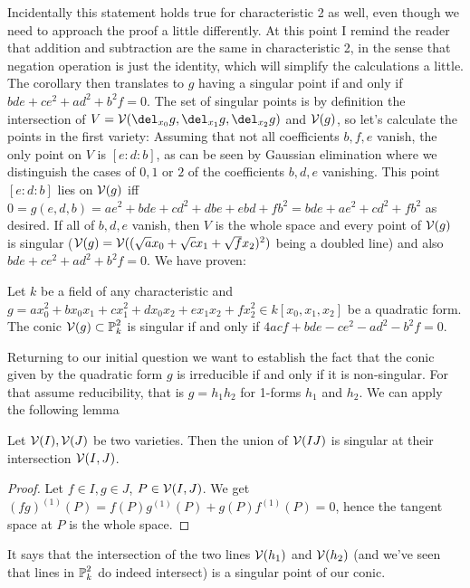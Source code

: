 Incidentally this statement holds true for characteristic 2 as well, even though we need to approach the proof a little differently.
At this point I remind the reader that addition and subtraction are the same in characteristic 2, in the sense that negation operation is just the identity, which will simplify the calculations a little.
The corollary then translates to $g$ having a singular point if and only if $bde + ce^2 +ad^2 + b^2f = 0$.
The set of singular points is by definition the intersection of $V = \V(\del_{x_0}g,\del_{x_1}g,\del_{x_2}g)$ and $\operatorname{\mathcal V}(g)$, so let's calculate the points in the first variety: Assuming that not all coefficients $b,f,e$ vanish, the only point on $V$ is $[e:d:b]$, as can be seen by Gaussian elimination where we distinguish the cases of $0,1$ or $2$ of the coefficients $b,d,e$ vanishing.
This point $[e:d:b]$ lies on $\operatorname{\mathcal V}(g)$ iff $0 = g(e,d,b) = ae^2 + bde + cd^2 + dbe + ebd + fb^2 = bde + ae^2 + cd^2 + fb^2$ as desired.
If all of $b,d,e$ vanish, then $V$ is the whole space and every point of $\operatorname{\mathcal V}(g)$ is singular ($\operatorname{\mathcal V}(g) = \operatorname{\mathcal V}((\sqrt{a}x_0 + \sqrt{c}x_1 + \sqrt{f}x_2)^2)$ being a doubled line) and also $bde + ce^2 + ad^2 + b^2f = 0$. We have proven:

\begin{corollary}
Let $k$ be a field of any characteristic and $g = ax_0^2 + bx_0x_1 + cx_1^2 + dx_0x_2 + ex_1x_2 + fx_2^2
 \in k[x_0,x_1,x_2]$ be a quadratic form. The conic $\operatorname{\mathcal V}(g) \subset \operatorname{\mathbb P}^2_k$ is singular if and only if $4acf + bde - ce^2 - ad^2 - b^2f = 0$.
\end{corollary}


Returning to our initial question we want to establish the fact that the conic given by the quadratic form $g$ is irreducible if and only if it is non-singular.
For that assume reducibility, that is $g = h_1h_2$ for 1-forms $h_1$ and $h_2$.
We can apply the following lemma
\begin{lemma} \label{lemmaSingularIntersect}
Let $\operatorname{\mathcal V}(I),\operatorname{\mathcal V}(J)$ be two varieties. Then the union of $\operatorname{\mathcal V}(IJ)$ is singular at their intersection $\operatorname{\mathcal V}(I,J)$.
\end{lemma}
\begin{proof}
Let $f\in I, g\in J$, $P\in \operatorname{\mathcal V}(I,J)$. We get $(fg)^{(1)}(P) = f(P)g^{(1)}(P) + g(P)f^{(1)}(P) = 0$, hence the tangent space at $P$ is the whole space.
\end{proof}
It says that the intersection of the two lines $\operatorname{\mathcal V}(h_1)$ and $\operatorname{\mathcal V}(h_2)$ (and we've seen that lines in $\operatorname{\mathbb P}^2_k$ do indeed intersect) is a singular point of our conic.

